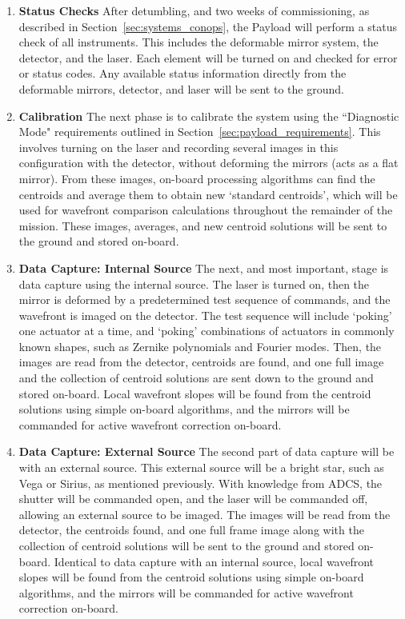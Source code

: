 \documentclass[12pt]{article}
\begin{document}
\begin{enumerate}
\item{\textbf{Status Checks}}
After detumbling, and two weeks of commissioning, as described in
Section~\ref{sec:systems_conops}, the Payload will perform a status check of all instruments. This includes the deformable mirror system, the detector, and the laser. Each element will be turned on and checked for error or status codes. Any available status information directly from the deformable mirrors, detector, and laser will be sent to the ground.

\item{\textbf{Calibration}}
The next phase is to calibrate the system using the ``Diagnostic Mode" requirements outlined in Section~\ref{sec:payload_requirements}.  This involves turning on the laser and recording several images in this configuration with the detector, without deforming the mirrors (acts as a flat mirror). From these images, on-board processing algorithms can find the centroids \cite{centroids} and average them to obtain new `standard centroids', which will be used for wavefront comparison calculations throughout the remainder of the mission. These images, averages, and new centroid solutions will be sent to the ground and stored on-board.

\item{\textbf{Data Capture: Internal Source}}
The next, and most important, stage is data capture using the internal source. The laser is turned on, then the mirror is deformed by a predetermined test sequence of commands, and the wavefront is imaged on the detector. The test sequence will include `poking' one actuator at a time, and `poking' combinations of actuators in commonly known shapes, such as Zernike polynomials and Fourier modes.  Then, the images are read from the detector, centroids are found, and one full image and the collection of centroid solutions are sent down to the ground and stored on-board.  Local wavefront slopes will be found from the centroid solutions using simple on-board algorithms, and the mirrors will be commanded for active wavefront correction on-board.

\item{\textbf{Data Capture: External Source}}
The second part of data capture will be with an external source. This external source will be a bright star, such as Vega or Sirius, as mentioned previously.  With
knowledge from ADCS, the shutter will be commanded open, and the laser
will be commanded off, allowing an external source to be imaged. The
images will be read from the detector, the centroids found, and one
full frame image along with the collection of centroid solutions will be
sent to the ground and stored on-board.  Identical to data capture with an internal source, local wavefront slopes will be found from the centroid solutions using simple on-board algorithms, and the mirrors will be commanded for active wavefront correction on-board. 

\end{enumerate}
\end{document}
